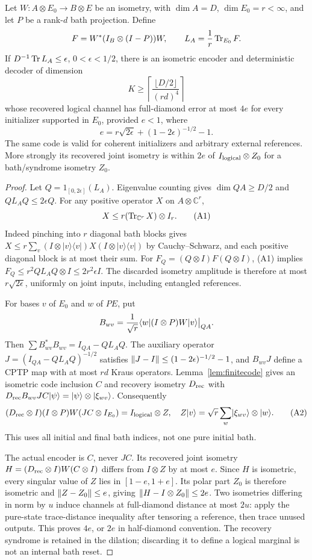 \begin{lemma}\label{lem:compression}
Let $W:A\otimes E_0\to B\otimes E$ be an isometry, with
$\dim A=D$, $\dim E_0=r<\infty$, and let $P$ be a rank-$d$ bath projection.
Define
\[
 F=W^*(I_B\otimes(I-P))W,\qquad L_A=\frac1r\operatorname{Tr}_{E_0}F.
\]
If $D^{-1}\operatorname{Tr} L_A\le\epsilon$, $0<\epsilon<1/2$, there is an isometric
encoder and deterministic decoder of dimension
\[
 K\ge\left\lceil\frac{\lfloor D/2\rfloor}{(rd)^4}\right\rceil
\]
whose recovered logical channel has full-diamond error at most $4e$ for
every initializer supported in $E_0$, provided $e<1$, where
\[
 e=r\sqrt{2\epsilon}+(1-2\epsilon)^{-1/2}-1.
\]
The same code is valid for coherent initializers and arbitrary external
references. More strongly its recovered joint isometry is within $2e$ of
$I_{\rm logical}\otimes Z_0$ for a bath/syndrome isometry $Z_0$.
\end{lemma}
\begin{proof}
Let $Q=1_{[0,2\epsilon]}(L_A)$. Eigenvalue counting gives
$\dim QA\ge D/2$ and $QL_AQ\le2\epsilon Q$.
For any positive operator $X$ on $A\otimes\mathbb C^r$,
\[
 X\le r(\operatorname{Tr}_{\mathbb C^r}X)\otimes I_r.
 \tag{A1}
\]
Indeed pinching into $r$ diagonal bath blocks gives
$X\le r\sum_v(I\otimes|v\rangle\langle v|)X(I\otimes|v\rangle\langle v|)$
by Cauchy--Schwarz, and each positive diagonal block is at most their sum.
For $F_Q=(Q\otimes I)F(Q\otimes I)$, (A1) implies
$F_Q\le r^2 QL_AQ\otimes I\le2r^2\epsilon I$. The discarded isometry
amplitude is therefore at most $r\sqrt{2\epsilon}$, uniformly on joint
inputs, including entangled references.

For bases $v$ of $E_0$ and $w$ of $PE$, put
\[
 B_{wv}=\frac1{\sqrt r}\langle w\rvert(I\otimes P)W\lvert v\rangle\big|_{QA}.
\]
Then $\sum B_{wv}^*B_{wv}=I_{QA}-QL_AQ$. The auxiliary operator
$J=(I_{QA}-QL_AQ)^{-1/2}$ satisfies
$\lVert J-I\rVert\le(1-2\epsilon)^{-1/2}-1$, and $B_{wv}J$ define a CPTP map
with at most $rd$ Kraus operators. Lemma~\ref{lem:finitecode} gives an
isometric code inclusion $C$ and recovery isometry $D_{\rm rec}$ with
$D_{\rm rec}B_{wv}JC\lvert \psi\rangle=\lvert \psi\rangle\otimes\lvert \xi_{wv}\rangle$.
Consequently
\[
 (D_{\rm rec}\otimes I)(I\otimes P)W(JC\otimes I_{E_0})
 =I_{\rm logical}\otimes Z,\quad
 Z\lvert v\rangle=\sqrt r\sum_w\lvert \xi_{wv}\rangle\otimes\lvert w\rangle.
 \tag{A2}
\]
This uses all initial and final bath indices, not one pure initial bath.

The actual encoder is $C$, never $JC$. Its recovered joint isometry
$H=(D_{\rm rec}\otimes I)W(C\otimes I)$ differs from $I\otimes Z$ by at
most $e$. Since $H$ is isometric, every singular value of $Z$ lies in
$[1-e,1+e]$. Its polar part $Z_0$ is therefore isometric and
$\lVert Z-Z_0\rVert\le e$, giving $\lVert H-I\otimes Z_0\rVert\le2e$.
Two isometries differing in norm by $u$ induce channels at full-diamond
distance at most $2u$: apply the pure-state trace-distance inequality after
tensoring a reference, then trace unused outputs. This proves $4e$, or $2e$
in half-diamond convention. The recovery syndrome is retained in the dilation;
discarding it to define a logical marginal is not an internal bath reset.
\end{proof}

